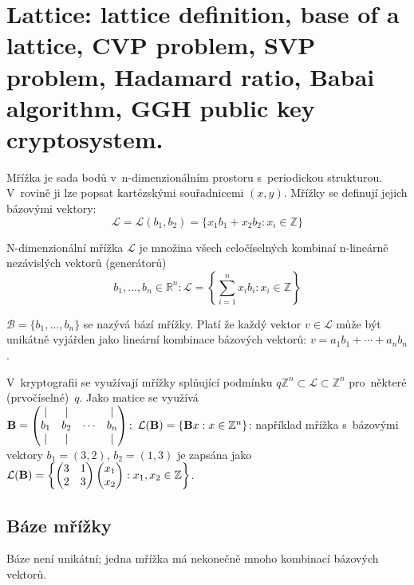 \section{Lattice: lattice definition, base of a lattice, CVP problem, SVP problem, Hadamard ratio, Babai algorithm, GGH public key cryptosystem.}

\newcommand{\lat}{\ensuremath{\mathcal{L}}}
\newcommand{\base}{\ensuremath{\text{\textbf{B}}}}

Mřížka je sada bodů v~n-dimenzionálním prostoru s~periodickou strukturou.
V~rovině ji lze popsat kartézskými souřadnicemi $(x, y)$.
Mřížky se definují jejich bázovými vektory:
$$\lat = \lat(b_1, b_2) = \{x_1b_1 + x_2b_2 : x_i \in \mathbb{Z}\}$$

N-dimenzionální mřížka $\lat$ je množina všech celočíselných kombinaí n-lineárně nezávislých vektorů (generátorů)
$$b_1, \dots, b_n \in \mathbb{R}^n : \lat = \left\{\sum_{i=1}^n x_ib_i : x_i \in \mathbb{Z}\right\}$$

$\mathcal{B} = \{b_1, \dots, b_n\}$ se nazývá bází mřížky.
Platí že každý vektor $v \in \lat$ může být unikátně vyjářden jako lineární kombinace bázových vektorů: $v = a_1b_1 + \cdots + a_nb_n$.

V~kryptografii se využívají mřížky splňující podmínku $q \mathbb{Z}^n \subset \lat \subset \mathbb{Z}^n$ pro~některé (prvočíselné)~$q$.
Jako matice se využívá
$\base = \left( \begin{matrix}
| & | & {} & | \\
b_1 & b_2 & \cdots & b_n \\
| & | & {} & |
\end{matrix} \right);\ \lat(\base) = \{\base x : x \in \mathbb{Z}^n\}$:
například mřížka s~bázovými vektory
$b_1 = (3, 2)$, $b_2 = (1, 3)$
je zapsána jako
$\lat(\base) = \left\{\left(\begin{matrix}3&1\\2&3\end{matrix}\right)\left(\begin{matrix}x_1\\x_2\end{matrix}\right): x_1, x_2 \in \mathbb{Z}\right\}$.


\subsection{Báze mřížky}

Báze není unikátní; jedna mřížka má nekonečně mnoho kombinací bázových vektorů.

